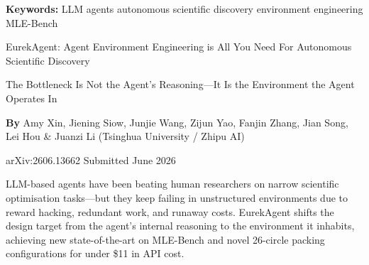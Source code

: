 \documentclass[10pt,twocolumn]{article}
\begin{document}
\setlength{\parindent}{0pt}
\setlength{\parskip}{4pt}

{\small\color{keywordgray}\textbf{Keywords:}
  LLM agents \textbullet{}
  autonomous scientific discovery \textbullet{}
  environment engineering \textbullet{}
  MLE-Bench}\par\vspace{4pt}

{\LARGE\bfseries\raggedright
  EurekAgent: Agent Environment Engineering is All You Need
  For Autonomous Scientific Discovery}\par\vspace{4pt}

{\large\itshape\raggedright
  The Bottleneck Is Not the Agent's Reasoning---It Is the
  Environment the Agent Operates In}\par\vspace{6pt}

{\small\textbf{By} Amy Xin, Jiening Siow, Junjie Wang, Zijun Yao,
  Fanjin Zhang, Jian Song, Lei Hou \& Juanzi Li
  (Tsinghua University / Zhipu AI)}\par\vspace{2pt}

{\small\color{keywordgray}arXiv:2606.13662 \textbullet{} Submitted June 2026}
\par\vspace{2pt}\noindent{\color{rulered}\rule{\columnwidth}{0.6pt}}\vspace{6pt}

LLM-based agents have been beating human researchers on narrow scientific
optimisation tasks---but they keep failing in unstructured environments
due to reward hacking, redundant work, and runaway costs. EurekAgent shifts
the design target from the agent's internal reasoning to the environment
it inhabits, achieving new state-of-the-art on MLE-Bench and novel
26-circle packing configurations for under \$11 in API cost.
\end{document}
